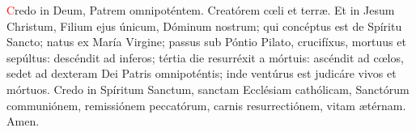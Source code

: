 \textcolor{red}{C}redo in Deum, Patrem omnipoténtem. Creatórem c{\oe}li et terr{\ae}. Et in Jesum Christum, Filium ejus únicum, Dóminum nostrum; 
qui concéptus est de Spíritu Sancto; natus ex María Virgine; passus sub Póntio Pilato, crucifíxus, mortuus et sepúltus:
descéndit ad inferos; tértia die resurréxit a mórtuis: ascéndit ad c{\oe}los, sedet ad dexteram Dei Patris omnipoténtis;
inde ventúrus est judicáre vivos et mórtuos. Credo in Spíritum Sanctum, sanctam Ecclésiam cathólicam, Sanctórum communiónem,
remissiónem peccatórum, carnis resurrectiónem, vitam {\ae}térnam. Amen.